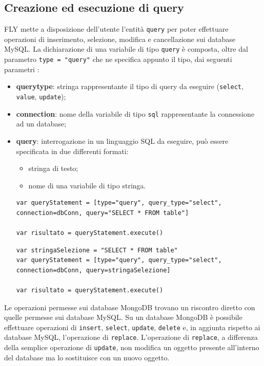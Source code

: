 \subsection{Creazione ed esecuzione di query}
FLY mette a disposizione dell'utente l'entità \verb|query| per poter effettuare operazioni di inserimento, selezione, modifica e cancellazione sui database MySQL. La dichiarazione di una variabile di tipo \verb|query| è composta, oltre dal parametro \verb|type = "query"| che ne specifica appunto il tipo, dai seguenti parametri \cite{giuseppe}:
\begin{itemize}
    \item \textbf{query\textunderscore type}: stringa rappresentante il tipo di query da eseguire (\verb|select|, \verb|value|, \verb|update|);
    \item \textbf{connection}: nome della variabile di tipo \verb|sql| rappresentante la connessione ad un database;
    \item \textbf{query}: interrogazione in un linguaggio SQL da eseguire, può essere specificata in due differenti formati:
    \begin{itemize}
        \item stringa di testo;
        \item nome di una variabile di tipo stringa.
    \end{itemize}
    \begin{lstlisting}[language=FLY,caption={Dichiarazione di entità query per l’esecuzione di un’interrogazione di selezione che utilizza una stringa di testo.}, label={lst:a:1}]
var queryStatement = [type="query", query_type="select", connection=dbConn, query="SELECT * FROM table"]

var risultato = queryStatement.execute()
\end{lstlisting}
   \begin{lstlisting}[language=FLY,caption={Dichiarazione di entità query per l’esecuzione di un’interrogazione di selezione che utilizza variabile di tipo stringa.}, label={lst:a:2}]
var stringaSelezione = "SELECT * FROM table"
var queryStatement = [type="query", query_type="select", connection=dbConn, query=stringaSelezione]
    
var risultato = queryStatement.execute()
\end{lstlisting}
\end{itemize}
Le operazioni permesse sui database MongoDB trovano un riscontro diretto con quelle permesse sui database MySQL. Su un database MongoDB è possibile effettuare operazioni di \verb|insert|, \verb|select|, \verb|update|, \verb|delete| e, in aggiunta rispetto ai database MySQL, l'operazione di \verb|replace|. L'operazione di \verb|replace|, a differenza della semplice operazione di \verb|update|, non modifica un oggetto presente all'interno del database ma lo sostituisce con un nuovo oggetto. \\
